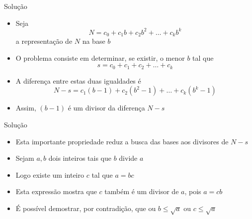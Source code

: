 \begin{frame}[fragile]{Solução}

    \begin{itemize}
        \item Seja
        \[
            N = c_0 + c_1b + c_2b^2 + \ldots + c_kb^k
        \]
        a representação de $N$ na base $b$

        \item O problema consiste em determinar, se existir, o menor $b$ tal que
        \[
            s = c_0 + c_1 + c_2 + \ldots + c_k
        \]

        \item A diferença entre estas duas igualdades é
        \[
            N - s = c_1(b - 1) + c_2(b^2 - 1) + \ldots + c_k(b^k - 1)
        \]

        \item Assim, $(b - 1)$ é um divisor da diferença $N - s$
    \end{itemize}

\end{frame}

\begin{frame}[fragile]{Solução}

    \begin{itemize}
        \item Esta importante propriedade reduz a busca das bases aos divisores de $N - s$

        \item Sejam $a, b$ dois inteiros tais que $b$ divide $a$

        \item Logo existe um inteiro $c$ tal que $a = bc$

        \item Esta expressão mostra que $c$ também é um divisor de $a$, pois $a = cb$

        \item É possível demostrar, por contradição, que ou $b\leq \sqrt{a}$ ou $c\leq \sqrt{a}$

   \end{itemize}

\end{frame}


